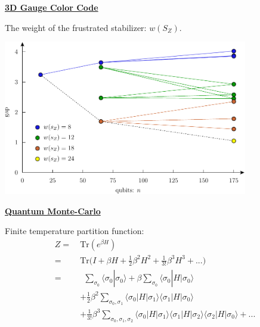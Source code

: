 \documentclass[11pt]{article}
\def\heading #1{\centerline{\underline{\bf\LARGE #1}}}
\def\vsp {\vspace*{0.5cm}}
\def\ket #1{|#1\rangle}
\def\bra #1{\langle #1|}
\newcommand{\braket}[2]{\langle{#1}|{#2}\rangle}
\def\Tr{\mbox{Tr}}
\begin{document}
\newpage %

\heading{3D Gauge Color Code}

The weight of the frustrated stabilizer:
$w(S_Z).$

\begin{center}
\includegraphics[width=0.8\textwidth]{pic-gap-stabs.pdf}
\end{center}

\vspace*{-0.4cm}
\rightline{[Burton2018]}

\newpage %

\heading{Quantum Monte-Carlo}

\vsp
Finite temperature partition function:
\begin{align*}
    Z =\ &\Tr( e^{\beta H} ) \\
      =\ &\Tr\bigl( I + \beta H 
        + \frac{1}{2} \beta^2 H^2
        + \frac{1}{3!} \beta^3 H^3
        + ... \bigr) \\
    =\ &\ \  \sum_{\sigma_0} \braket{\sigma_0}{\sigma_0} 
       + \beta \sum_{\sigma_0} \bra{\sigma_0} H \ket{\sigma_0} \\
     &  + \frac{1}{2} \beta^2 
        \sum_{\sigma_0, \sigma_1} \bra{\sigma_0} H \ket{\sigma_1}
        \bra{\sigma_1} H \ket{\sigma_0} \\
     &  + \frac{1}{3!} \beta^3 
        \sum_{\sigma_0, \sigma_1, \sigma_2}
        \bra{\sigma_0} H \ket{\sigma_1}
        \bra{\sigma_1} H \ket{\sigma_2}
        \bra{\sigma_2} H \ket{\sigma_0} + ...\\
\end{align*}

\newpage %
\end{document}
